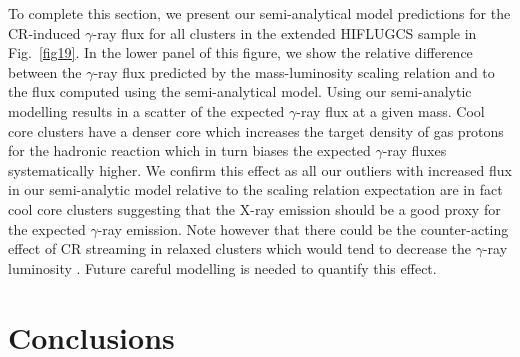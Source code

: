 \documentclass[10pt,aps,pra,reprint,amsmath,amsfonts,amssymb,showpacs,nofootinbib,floatfix]{revtex4-1}
\def\del#1{{}}
\newcommand{\rmn}{\mathrm}
\newcommand{\tev}{\rmn{TeV}}
\newcommand{\e}{\rmn{e}}
\newcommand{\eg}{E_\gamma}
\begin{document}
To complete this section, we present our semi-analytical model
predictions for the CR-induced $\gamma$-ray flux for all clusters in
the extended HIFLUGCS sample in Fig.~\ref{fig19}. In the lower panel
of this figure, we show the relative difference between the
$\gamma$-ray flux predicted by the mass-luminosity scaling relation
and to the flux computed using the semi-analytical model. Using our
semi-analytic modelling results in a scatter of the expected
$\gamma$-ray flux at a given mass. Cool core clusters have a denser
core which increases the target density of gas protons for the
hadronic reaction which in turn biases the expected $\gamma$-ray
fluxes systematically higher. We confirm this effect as all our
outliers with increased flux in our semi-analytic model relative to
the scaling relation expectation are in fact cool core clusters
suggesting that the X-ray emission should be a good proxy for the
expected $\gamma$-ray emission. Note however that there could be the
counter-acting effect of CR streaming in relaxed clusters which would
tend to decrease the $\gamma$-ray luminosity
\cite{2011A&A...527A..99E}. Future careful modelling is needed to
quantify this effect.


\del{
ANDERS: do you need this?
--) The dust turns up at about a factor 100 lower than the stars
--) The other figure show the spectral shape of the IC-star with the same
spectral shape as the dust, it shows the same gamma-ray slope as the dust
--) The reason why there is only a factor 10 difference in the break in the
gamma-ray emission between the star and dust is related to the KN. In our CRp
paper, the last figure shows that at $\eg=100\,\tev$, the spectra is suppressed
with about a factor 10 (also depends on $\alpha_\e$). Since the dust photons
have a factor 10 higher energy, I expect this suppression at about 10~TeV. For
star photons the suppression should be at 100~GeV. So the star photons are
definitely KN suppressed, which explains the earlier break and the steeper
slope.
}


%



\section{Conclusions}
\end{document}
